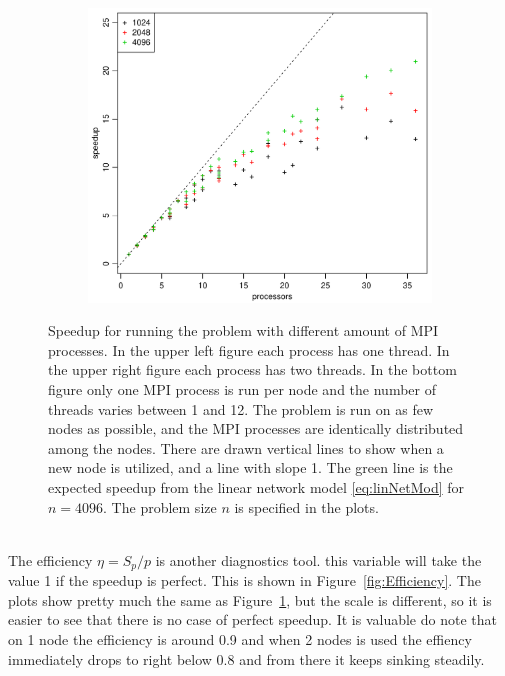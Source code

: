 \begin{figure}[h!]
\begin{subfigure}[b]{0.48\textwidth}
  \end{subfigure}
  \quad
  \begin{subfigure}[b]{0.48\textwidth}
    \includegraphics[width=\textwidth]{./Figures/taskbSpeedupNodesTimesThreads.pdf}
  \end{subfigure}
  \vspace{-0.1\baselineskip}
  \caption{Speedup for running the problem with different amount of MPI processes. In the upper left figure each process has one thread. In the upper right figure each process has two threads. In the bottom figure only one MPI process is run per node and the number of threads varies between 1 and 12. The problem is run on as few nodes as possible, and the MPI processes are identically distributed among the nodes. There are drawn vertical lines to show when a new node is utilized, and a line with slope 1. The green line is the expected speedup from the linear network model \eqref{eq:linNetMod} for $n = 4096$. The problem size $n$ is specified in the plots. }
  \label{fig:Speedup}
\end{figure}
%
\\
The efficiency $\eta = S_p/p $ is another diagnostics tool. this variable will take the value 1 if the speedup is perfect. This is shown in Figure~\ref{fig:Efficiency}. The plots show pretty much the same as Figure~\ref{fig:Speedup}, but the scale is different, so it is easier to see that there is no case of perfect speedup. It is valuable do note that on 1 node the efficiency is around 0.9 and when 2 nodes is used the effiency immediately drops to right below 0.8 and from there it keeps sinking steadily. 
